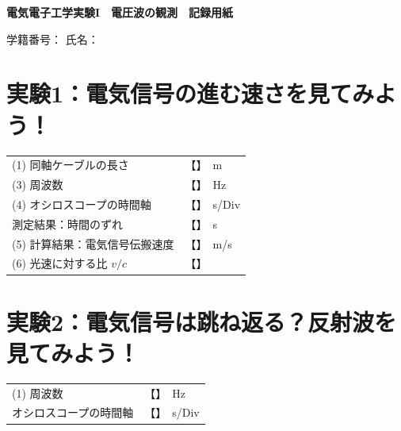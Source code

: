 
\begin{center}
  {\sffamily\gtfamily\bfseries\Large 電気電子工学実験I　電圧波の観測　記録用紙}
\end{center}

\vspace{0.6\baselineskip}
\begin{flushright}
  学籍番号：\underline{\hspace{12\zw}}\quad
  氏名：\underline{\hspace{12\zw}}
\end{flushright}
\vspace{0.8\baselineskip}

\newcommand{\fillin}[1][]{【\makebox[6\zw]{\answer{#1}}】}
\renewcommand{\arraystretch}{1.22}%

\section*{実験1：電気信号の進む速さを見てみよう！}

\begin{tabular}{@{}ll@{}}
  (1) 同軸ケーブルの長さ & \fillin\ m \\
  (3) 周波数 & \fillin\ Hz \\
  (4) オシロスコープの時間軸 & \fillin\ s/Div \\
  \phantom{(4)} 測定結果：時間のずれ & \fillin\ s \\
  (5) 計算結果：電気信号伝搬速度 & \fillin\ m/s \\
  (6) 光速に対する比 $v/c$ & \fillin \\
\end{tabular}

\section*{実験2：電気信号は跳ね返る？反射波を見てみよう！}

\begin{tabular}{@{}ll@{}}
  (1) 周波数 & \fillin[500 k]\ Hz \\
  \phantom{(1)} オシロスコープの時間軸 & \fillin[500 n]\ s/Div \\
\end{tabular}


